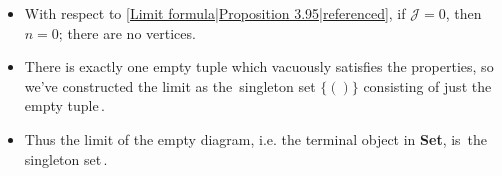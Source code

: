 
\begin{itemize}
    \item  With respect to \ref{Limit formula|Proposition 3.95|referenced}, if $\mathcal{J}=0$, then $n=0$; there are no vertices.
    \item There is exactly one empty tuple which vacuously satisfies the properties, so we've constructed the limit as the \,singleton set $\{()\}$ consisting of just the empty tuple\,.
    \item Thus the limit of the empty diagram, i.e. the terminal object in \textbf{Set}, is \,the singleton set\,.

  \end{itemize}